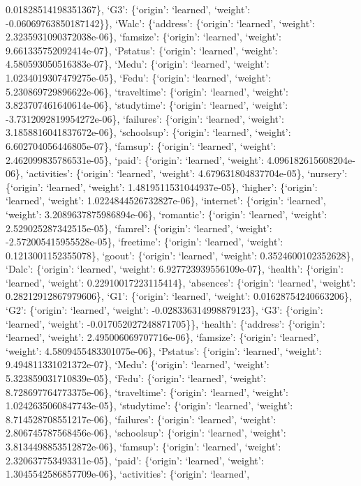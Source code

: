 \documentclass[
]{article}
\begin{document}
0.01828514198351367\}, `G3': \{`origin': `learned', `weight':
-0.06069763850187142\}\}, `Walc': \{`address': \{`origin': `learned',
`weight': 2.3235931090372038e-06\}, `famsize': \{`origin': `learned',
`weight': 9.661335752092414e-07\}, `Pstatus': \{`origin': `learned',
`weight': 4.580593050516383e-07\}, `Medu': \{`origin': `learned',
`weight': 1.0234019307479275e-05\}, `Fedu': \{`origin': `learned',
`weight': 5.230869729896622e-06\}, `traveltime': \{`origin': `learned',
`weight': 3.823707461640614e-06\}, `studytime': \{`origin': `learned',
`weight': -3.7312092819954272e-06\}, `failures': \{`origin': `learned',
`weight': 3.1858816041837672e-06\}, `schoolsup': \{`origin': `learned',
`weight': 6.602704056446805e-07\}, `famsup': \{`origin': `learned',
`weight': 2.462099835786531e-05\}, `paid': \{`origin': `learned',
`weight': 4.096182615608204e-06\}, `activities': \{`origin': `learned',
`weight': 4.679631804837704e-05\}, `nursery': \{`origin': `learned',
`weight': 1.4819511531044937e-05\}, `higher': \{`origin': `learned',
`weight': 1.0224844526732827e-06\}, `internet': \{`origin': `learned',
`weight': 3.2089637875986894e-06\}, `romantic': \{`origin': `learned',
`weight': 2.529025287342515e-05\}, `famrel': \{`origin': `learned',
`weight': -2.572005415955528e-05\}, `freetime': \{`origin': `learned',
`weight': 0.1213001152355078\}, `goout': \{`origin': `learned',
`weight': 0.3524600102352628\}, `Dalc': \{`origin': `learned', `weight':
6.927723939556109e-07\}, `health': \{`origin': `learned', `weight':
0.22910017223115414\}, `absences': \{`origin': `learned', `weight':
0.28212912867979606\}, `G1': \{`origin': `learned', `weight':
0.01628754240663206\}, `G2': \{`origin': `learned', `weight':
-0.028336314998879123\}, `G3': \{`origin': `learned', `weight':
-0.017052027248871705\}\}, `health': \{`address': \{`origin': `learned',
`weight': 2.495006069707716e-06\}, `famsize': \{`origin': `learned',
`weight': 4.5809455483301075e-06\}, `Pstatus': \{`origin': `learned',
`weight': 9.494811331021372e-07\}, `Medu': \{`origin': `learned',
`weight': 5.323859031710839e-05\}, `Fedu': \{`origin': `learned',
`weight': 8.728697764773375e-06\}, `traveltime': \{`origin': `learned',
`weight': 1.0242635060847743e-05\}, `studytime': \{`origin': `learned',
`weight': 8.714528708551217e-06\}, `failures': \{`origin': `learned',
`weight': 2.806745787568456e-06\}, `schoolsup': \{`origin': `learned',
`weight': 3.8134498853512872e-06\}, `famsup': \{`origin': `learned',
`weight': 2.320637753493311e-05\}, `paid': \{`origin': `learned',
`weight': 1.3045542586857709e-06\}, `activities': \{`origin': `learned',
\end{document}
